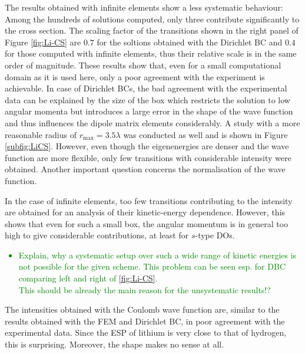 The results obtained with infinite elements show a less systematic behaviour: Among the hundreds of solutions computed, only three contribute significantly to the cross section.
The scaling factor of the transitions shown in the right panel of Figure \ref{fig:Li-CS} are $0.7$ for the soltions obtained with the Dirichlet BC and $0.4$ for those computed with infinite elements, thus their relative scale is in the same order of magnitude.
These results show that, even for a small computational domain as it is used here, only a poor agreement with the experiment is achievable.
In case of Dirichlet BCs, the bad agreement with the experimental data can be explained by the size of the box which restricts the solution to low angular momenta but introduces a large error in the shape of the wave function and thus influences the dipole matrix elements considerably.
A study with a more reasonable radius of $r_\text{max}=3.5\lambda$ was conducted as well and is shown in Figure \ref{subfig:LiCS}.
However, even though the eigenenergies are denser and the wave function are more flexible, only few transitions with considerable intensity were obtained.
Another important question concerns the normalisation of the wave function.

In the case of infinite elements, too few transitions contributing to the intensity are obtained for an analysis of their kinetic-energy dependence.
However, this shows that even for such a small box, the angular momentum is in general too high to give considerable contributions, at least for $s$-type DOs.

\textcolor{green}{
\begin{itemize}
   \item Explain, why a systematic setup over such a wide range of kinetic energies is not possible for the given scheme. This problem can be seen esp. for DBC comparing left and right of \ref{fig:Li-CS}.\\
    This should be already the main reason for the unsystematic results!?
\end{itemize}
}

\textcolor[rgb]{1,0.7,0}{
   The intensities obtained with the Coulomb wave function are, similar to the results obtained with the FEM and Dirichlet BC, in poor agreement with the experimental data.
   Since the ESP of lithium is very close to that of hydrogen, this is surprising.
   Moreover, the shape makes no sense at all.
}


